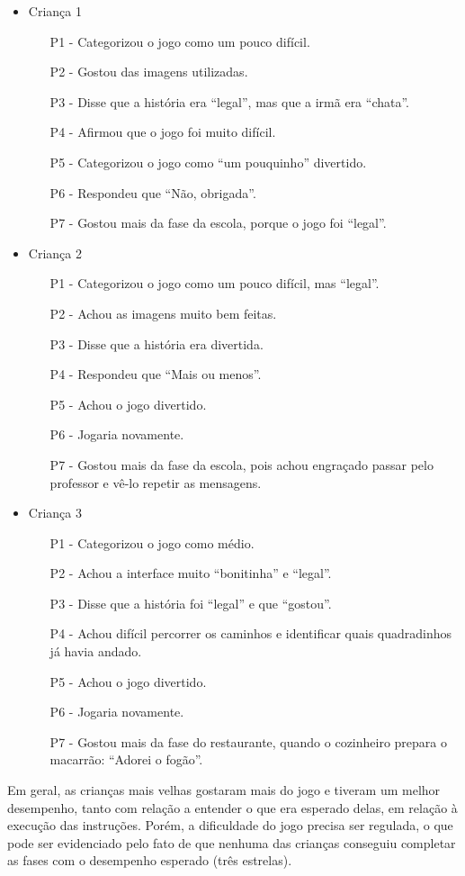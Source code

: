 \begin{itemize}
	\item Criança 1
	\begin{itemize}
		\item[P1] - Categorizou o jogo como um pouco difícil.
		\item[P2] - Gostou das imagens utilizadas.
		\item[P3] - Disse que a história era “legal”, mas que a irmã era “chata”.
		\item[P4] - Afirmou que o jogo foi muito difícil.
		\item[P5] - Categorizou o jogo como “um pouquinho” divertido.
		\item[P6] - Respondeu que “Não, obrigada”.
		\item[P7] - Gostou mais da fase da escola, porque o jogo foi “legal”.
	\end{itemize}
	\item Criança 2
	\begin{itemize}
		\item[P1] - Categorizou o jogo como um pouco difícil, mas “legal”.
		\item[P2] - Achou as imagens muito bem feitas.
		\item[P3] - Disse que a história era divertida.
		\item[P4] - Respondeu que “Mais ou menos”.
		\item[P5] - Achou o jogo divertido.
		\item[P6] - Jogaria novamente.
		\item[P7] - Gostou mais da fase da escola, pois achou engraçado passar pelo professor e vê-lo repetir as mensagens.
	\end{itemize}
	\item Criança 3
	\begin{itemize}
		\item[P1] - Categorizou o jogo como médio.
		\item[P2] - Achou a interface muito “bonitinha” e “legal”.
		\item[P3] - Disse que a história foi “legal” e que “gostou”.
		\item[P4] - Achou difícil percorrer os caminhos e identificar quais quadradinhos já havia andado.
		\item[P5] - Achou o jogo divertido.
		\item[P6] - Jogaria novamente.
		\item[P7] - Gostou mais da fase do restaurante, quando o cozinheiro prepara o macarrão: “Adorei o fogão”.
	\end{itemize}
\end{itemize}

Em geral, as crianças mais velhas gostaram mais do jogo e tiveram um melhor desempenho, tanto com relação a entender o que era esperado delas, em relação à execução das instruções. Porém, a dificuldade do jogo precisa ser regulada, o que pode ser evidenciado pelo fato de que nenhuma das crianças conseguiu completar as fases com o desempenho esperado (três estrelas).
